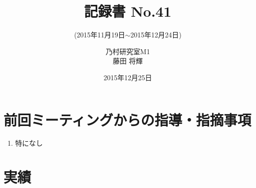 \documentclass[fleqn, 14pt]{extarticle}
\subtitle{(2015年11月19日$\sim$2015年12月24日)}
\author{乃村研究室M1\\藤田 将輝}
\date{2015年12月25日}
\title{記録書 No.41}
\begin{document}
    \maketitle

    \section{前回ミーティングからの指導・指摘事項}
    \label{sec-1}
    \begin{enumerate}
        \item 特になし
    \end{enumerate}

    \section{実績}
    \label{sec-2}
\end{document}
